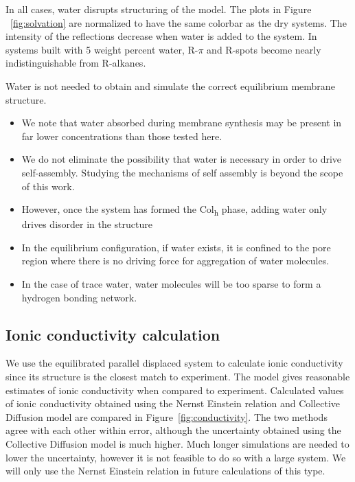 \documentclass{article}
\begin{document}
  In all cases, water disrupts structuring of the model. The plots in Figure
  ~\ref{fig:solvation} are normalized to have the same colorbar as the dry
  systems. The intensity of the reflections decrease when water is added to the
  system. In systems built with 5 weight percent water, R-$\pi$ and R-spots
  become nearly indistinguishable from R-alkanes.

  Water is not needed to obtain and simulate the correct equilibrium 
  membrane structure.
  \begin{itemize}
	\item We note that water absorbed during membrane synthesis may
        be present in far lower concentrations than those 
        tested here.
	\item We do not eliminate the possibility that water is necessary
        in order to drive self-assembly. Studying the mechanisms of self assembly is
	beyond the scope of this work.
	\item However, once the system has formed the Col\textsubscript{h} 
	phase, adding water only drives disorder in the structure
	\item In the equilibrium configuration, if water exists, it is confined
	to the pore region where there is no driving force for aggregation of 
	water molecules. 
	\item In the case of trace water, water molecules will be too sparse to
	form a hydrogen bonding network.
  \end{itemize}

  \subsection*{Ionic conductivity calculation}

  We use the equilibrated parallel displaced system to calculate ionic
  conductivity since its structure is the closest match to experiment. The model
  gives reasonable estimates of ionic conductivity when compared to experiment.
  Calculated values of ionic conductivity obtained using the Nernst Einstein
  relation and Collective Diffusion model are compared in
  Figure~\ref{fig:conductivity}. The two methods agree with each other within
  error, although the uncertainty obtained using the Collective Diffusion model
  is much higher. Much longer simulations are needed to lower the uncertainty,
  however it is not feasible to do so with a large system. We will only use the
  Nernst Einstein relation in future calculations of this type. 
\end{document}
